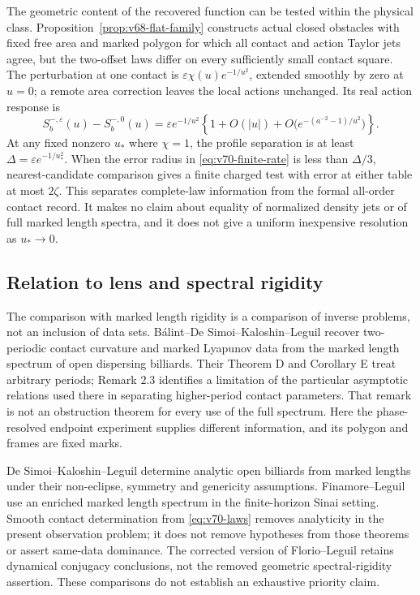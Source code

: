 The geometric content of the recovered function can be tested within
the physical class.  Proposition~\ref{prop:v68-flat-family} constructs
actual closed obstacles with fixed free area and marked polygon for which
all contact and action Taylor jets agree, but the two-offset laws differ
on every sufficiently small contact square.  The perturbation at one
contact is $\varepsilon\chi(u)e^{-1/u^2}$, extended smoothly by zero
at $u=0$; a remote area correction leaves the local actions unchanged.
Its real action response is
\[
 S_b^{-,\varepsilon}(u)-S_b^{-,0}(u)
  =\varepsilon e^{-1/u^2}\left\{1+O(|u|)
       +O\bigl(e^{-(a^{-2}-1)/u^2}\bigr)\right\}.
\]
At any fixed nonzero $u_*$ where $\chi=1$, the profile separation is
at least $\Delta=\varepsilon e^{-1/u_*^2}$.  When the error radius in
\eqref{eq:v70-finite-rate} is less than $\Delta/3$, nearest-candidate
comparison gives a finite charged test with error at either table at
most $2\zeta$.  This separates complete-law information from the
formal all-order contact record.  It makes no claim about equality of
normalized density jets or of full marked length spectra, and it does
not give a uniform inexpensive resolution as $u_*\to0$.






\subsection{Relation to lens and spectral rigidity}



The comparison with marked length rigidity is a comparison of inverse
problems, not an inclusion of data sets.  B\'alint--De Simoi--Kaloshin--Leguil
\cite{BDKL} recover two-periodic contact curvature and marked Lyapunov
data from the marked length spectrum of open dispersing billiards.
Their Theorem D and Corollary E treat arbitrary periods; Remark 2.3
identifies a limitation of the particular asymptotic relations used
there in separating higher-period contact parameters.  That remark is
not an obstruction theorem for every use of the full spectrum.  Here
the phase-resolved endpoint experiment supplies different information,
and its polygon and frames are fixed marks.

De Simoi--Kaloshin--Leguil \cite{DSKL} determine analytic open billiards
from marked lengths under their non-eclipse, symmetry and genericity
assumptions.  Finamore--Leguil \cite{FinamoreLeguil} use an enriched
marked length spectrum in the finite-horizon Sinai setting.  Smooth
contact determination from \eqref{eq:v70-laws} removes analyticity
in the present observation problem; it does not remove hypotheses
from those theorems or assert same-data dominance.  The corrected
version of Florio--Leguil \cite{FlorioLeguil} retains dynamical
conjugacy conclusions, not the removed geometric spectral-rigidity
assertion.  These comparisons do not establish an exhaustive priority
claim.

